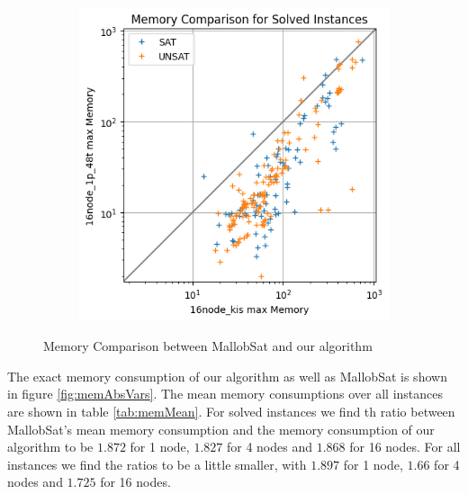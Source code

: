 \documentclass[12pt,a4paper,twoside]{scrartcl}
\numberwithin{equation}{section}
\begin{document}
\begin{figure}
\begin{subfigure}[c]{.4\textwidth}
    \label{fig:memCompare4node}
  \end{subfigure}
  \begin{subfigure}[c]{.4\textwidth}
    \center
    \includegraphics[scale=.5]{plots/square_mem_compare/square_mem_16node.png}
    \label{fig:memCompare16node}
  \end{subfigure}
  \caption{Memory Comparison between MallobSat and our algorithm}
  \label{fig:memCompare}
\end{figure}

The exact memory consumption of our algorithm as well as MallobSat is shown in figure \ref{fig:memAbsVars}. The mean memory consumptions over all instances are shown in table \ref{tab:memMean}. For solved instances we find th ratio between MallobSat's mean memory consumption and the memory consumption of our algorithm to be $1.872$ for 1 node, $1.827$ for 4 nodes and $1.868$ for 16 nodes. For all instances we find the ratios to be a little smaller, with $1.897$ for 1 node, $1.66$ for 4 nodes and $1.725$ for 16 nodes.
\end{document}
